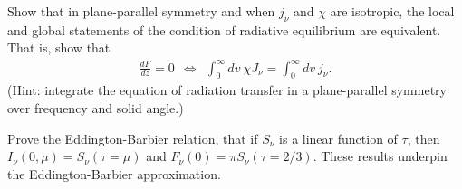 
\begin{problem}
Show that in plane-parallel symmetry and when $j_\nu$ and $\chi$ are isotropic, the local and global statements of
the condition of radiative equilibrium are equivalent. That is, show
that
\begin{align}
\frac{dF}{dz} = 0 
\ \ \Leftrightarrow\ \ 
\int_0^\infty\!\!\!dv\:
\chi J_\nu
=
\int_0^\infty\!\!\!dv\: j_\nu.
\end{align}
(Hint: integrate the equation of radiation transfer in a plane-parallel
symmetry over frequency and solid angle.)
\label{problem-radiative-equilibrium}
\end{problem}

\begin{problem}
\label{problem-eddington-barbier} Prove the
Eddington-Barbier relation, that if $S_\nu$ is a linear function of
$\tau$, then $I_\nu(0,\mu) = S_\nu(\tau = \mu)$ and $F_\nu(0) =
\pi S_\nu(\tau = 2/3)$. These results underpin the Eddington-Barbier
approximation.
\end{problem}

